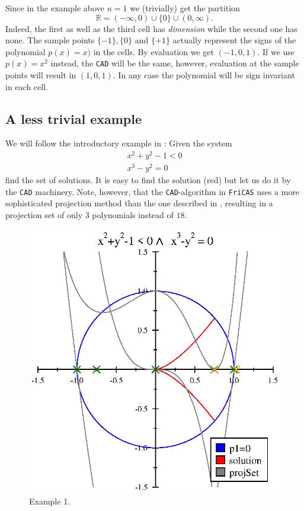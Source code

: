 \documentclass[12pt,a4paper]{article}
\newcommand{\CAD}{{\tt CAD}}
\begin{document}
Since in the example above $n=1$ we (trivially) get the partition
%
\begin{equation}
       \mathbb{R} = (-\infty,0) \cup \{0\} \cup (0,\infty).
\end{equation}
Indeed, the first as well as the third cell has {\em dimension} while
the second one has none. The sample points $\{-1\},\{0\}$ and $\{+1\}$
actually represent the signs of the polynomial $p(x)=x)$ in the cells.
By evaluation we get $(-1,0,1)$. If we use $p(x)=x^2$ instead, the
{\tt CAD} will be the same, however, evaluation at the sample points
will result in $(1,0,1)$. In any case the polynomial will be sign
invariant in each cell.

\subsection{A less trivial example}\label{ex1}
We will follow the introductory example in \cite{JM95}: Given the system
\begin{eqnarray*}
     x^2 + y^2 -1 < 0 \\
     x^3 - y^2 = 0
\end{eqnarray*}
find the set of solutions. It is easy to find the solution (red) but let us
do it by the {\CAD} machinery. Note, however, that the {\CAD}-algorithm in
{\tt FriCAS} uses a more sophisticated projection method than the one 
described in \cite{JM95}, resulting in a projection set of only $3$ 
polynomials instead of $18$.
%
\begin{figure}[!htb]
\centering
\includegraphics[scale=1.0]{cad1.eps}
\caption{Example 1.}
\label{fig:cad1}
\end{figure}
\end{document}
